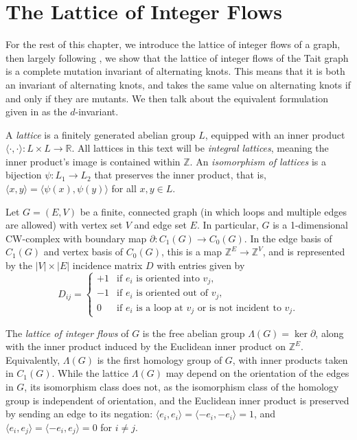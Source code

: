 \documentclass[12pt]{report}
\newcommand{\R}{\mathbb{R}}
\newcommand{\Z}{\mathbb{Z}}
\newcommand{\ip}[2]{\langle #1, #2 \rangle}
\theoremstyle{upright}
\begin{document}
\section{The Lattice of Integer Flows}

For the rest of this chapter, we introduce the lattice of integer flows of a graph, then largely following \cite{lattices-graphs-mutation}, we show that the lattice of integer flows of the Tait graph is a complete mutation invariant of alternating knots. This means that it is both an invariant of alternating knots, and takes the same value on alternating knots if and only if they are mutants. We then talk about the equivalent formulation given in \cite{lattices-graphs-mutation} as the $d$-invariant.

A \textit{lattice} is a finitely generated abelian group $L$, equipped with an inner product 
\({\ip{\cdot}{\cdot}: L \times L \longrightarrow \R}\). All lattices in this text will be \textit{integral lattices}, meaning the inner product's image is contained within $\Z$. An \textit{isomorphism of lattices} is a bijection $\psi: L_{1} \longrightarrow L_{2}$ that preserves the inner product, that is, ${\ip{x}{y} = \ip{\psi(x)}{\psi(y)}}$ for all $x, y \in L$.

Let $G = (E, V)$ be a finite, connected graph (in which loops and multiple edges are allowed) with vertex set $V$ and edge set $E$. In particular, $G$ is a 1-dimensional CW-complex with boundary map $\partial: C_{1}(G) \longrightarrow C_{0}(G)$. In the edge basis of $C_{1}(G)$ and vertex basis of $C_{0}(G)$, this is a map $\Z^{E} \longrightarrow \Z^{V}$, and is represented by the $|V|\times|E|$ incidence matrix $D$ with entries given by
\[D_{ij} = \begin{cases}
	+1 & \text{if $e_{i}$ is oriented into $v_{j}$,}   \\
	-1 & \text{if $e_{i}$ is oriented out of $v_{j}$,} \\
	0  & \text{if $e_{i}$ is a loop at $v_{j}$ or is not incident to $v_{j}$.}
\end{cases}\]

The \textit{lattice of integer flows} of $G$ is the free abelian group $\Lambda(G) = \ker \partial$, along with the inner product induced by the Euclidean inner product on $\Z^{E}$. Equivalently, $\Lambda(G)$ is the first homology group of $G$, with inner products taken in $C_{1}(G)$. While the lattice $\Lambda(G)$ may depend on the orientation of the edges in $G$, its isomorphism class does not, as the isomorphism class of the homology group is independent of orientation, and the Euclidean inner product is preserved by sending an edge to its negation: $\ip{e_{i}}{e_{i}} =  \ip{-e_{i}}{-e_{i}} = 1$, and $\ip{e_{i}}{e_{j}} = \ip{-e_{i}}{e_{j}} = 0$ for $i \neq j$.
\end{document}
